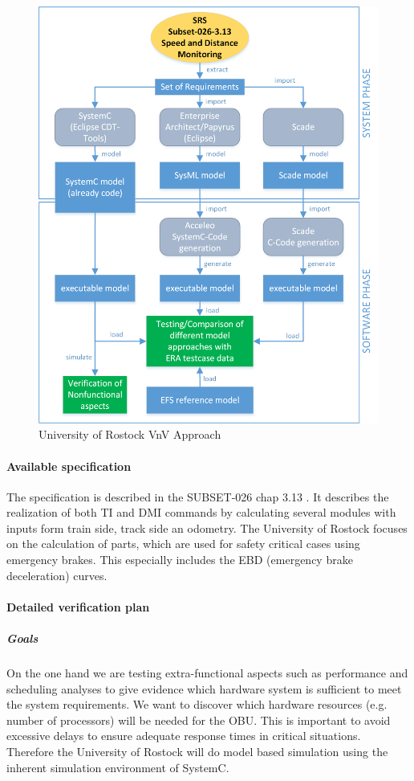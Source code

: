 \documentclass{article}
\begin{document}
\begin{figure}[h]
\centering
\includegraphics[width=.80\textwidth]{schema/UniRostockApproach.png}
\vspace{4mm}
\caption{University of Rostock VnV Approach}
\label{fig:University of Rostock VnV Approach} 
\end{figure}

\paragraph{Available specification}

The specification is described in the
SUBSET-026\cite{unisig_subset-026_2012} chap 3.13 \cite{chap3-13}. It describes the realization of both TI and DMI commands by calculating several modules with inputs form train side, track side an odometry. The University of Rostock focuses on the calculation of parts, which are used for safety critical cases using emergency brakes. This especially includes the EBD (emergency brake deceleration) curves.

\paragraph{Detailed verification plan}

\subparagraph{Goals}

On the one hand we are testing extra-functional aspects such as performance and scheduling analyses to give evidence which hardware system is sufficient to meet the system requirements. We want to discover which hardware resources (e.g. number of processors) will be needed for the OBU. This is important to avoid excessive delays to ensure adequate response times in critical situations. Therefore the University of Rostock will do model based simulation using the inherent simulation environment of SystemC.
\end{document}
